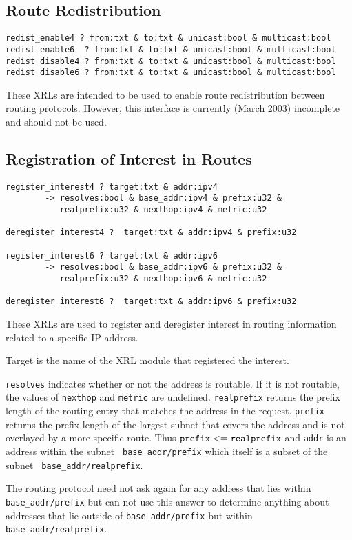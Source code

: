 \documentclass[11pt]{article}
\begin{document}
\subsection{Route Redistribution}
\begin{verbatim}
redist_enable4 ? from:txt & to:txt & unicast:bool & multicast:bool
redist_enable6  ? from:txt & to:txt & unicast:bool & multicast:bool
redist_disable4 ? from:txt & to:txt & unicast:bool & multicast:bool
redist_disable6 ? from:txt & to:txt & unicast:bool & multicast:bool
\end{verbatim}
These XRLs are intended to be used to enable route redistribution
between routing protocols.  However, this interface is currently
(March 2003) incomplete and should not be used.

\subsection{Registration of Interest in Routes}
\label{reg}
\begin{verbatim}
register_interest4 ? target:txt & addr:ipv4 
        -> resolves:bool & base_addr:ipv4 & prefix:u32 & 
           realprefix:u32 & nexthop:ipv4 & metric:u32

deregister_interest4 ?  target:txt & addr:ipv4 & prefix:u32

register_interest6 ? target:txt & addr:ipv6 
        -> resolves:bool & base_addr:ipv6 & prefix:u32 & 
           realprefix:u32 & nexthop:ipv6 & metric:u32

deregister_interest6 ?  target:txt & addr:ipv6 & prefix:u32
\end{verbatim}
These XRLs are used to register and deregister interest in routing
information related to a specific IP address. 

Target is the name of the XRL module that registered the interest.

{\tt resolves} indicates whether or not the address is routable.  If
it is not routable, the values of {\tt nexthop} and {\tt metric} are
undefined.  {\tt realprefix} returns the prefix length of the routing
entry that matches the address in the request.  {\tt prefix} returns
the prefix length of the largest subnet that covers the address and is
not overlayed by a more specific route.  Thus ${\tt prefix} <= {\tt
realprefix}$ and {\tt addr} is an address within the subnet {\tt
base\_addr/prefix} which itself is a subset of the subnet {\tt
base\_addr/realprefix}.  

The routing protocol need not ask again for any address that lies
within {\tt base\_addr/prefix} but can not use this answer to determine
anything about addresses that lie outside of {\tt base\_addr/prefix}
but within {\tt base\_addr/realprefix}.
\end{document}

